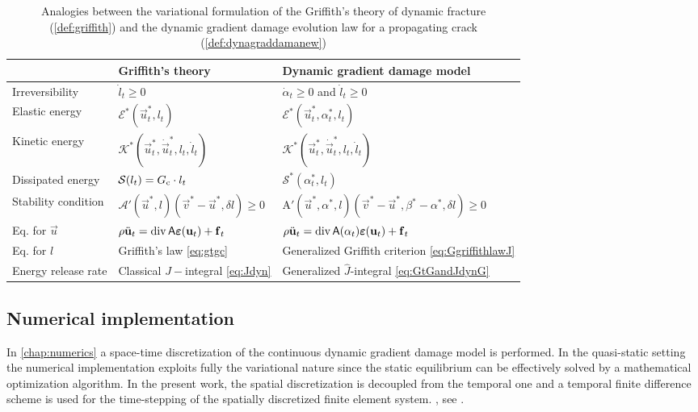 \begin{table}[htbp]
\caption{Analogies between the variational formulation of the Griffith's theory of dynamic fracture (\cref{def:griffith}) and the dynamic gradient damage evolution law for a propagating crack (\cref{def:dynagraddamanew})} \label{tab:analogy}
\centering
\begin{tabular}{lll} \toprule
 & Griffith's theory & Dynamic gradient damage model \\ \midrule
Irreversibility & $\dot{l}_t\geq 0$ & $\dot{\alpha}_t\geq 0$ and $\dot{l}_t\geq 0$ \\
Elastic energy & $\mathcal{E}^*(\vec{u}^*_t,l_t)$ & $\mathcal{E}^*(\vec{u}^*_t,\alpha^*_t,l_t)$ \\
Kinetic energy & $\mathcal{K}^*(\vec{u}_t^*,\dot{\vec{u}}_t^*,l_t,\dot{l}_t)$ & $\mathcal{K}^*(\vec{u}_t^*,\dot{\vec{u}}_t^*,l_t,\dot{l}_t)$ \\
Dissipated energy & $\mathcal{S}(l_t)=G_\mathrm{c}\cdot l_t$ & $\mathcal{S}^*(\alpha^*_t,l_t)$ \\
Stability condition & $\mathcal{A}'(\vec{u}^*,l)(\vec{v}^*-\vec{u}^*,\delta l)\geq 0$ & $\mathrm{A}'(\vec{u}^*,\alpha^*,l)(\vec{v}^*-\vec{u}^*,\beta^*-\alpha^*,\delta l)\geq 0$ \\
Eq. for $\vec{u}$ & $\rho\ddot{\vec{u}}_t=\div\tens{A}\eps(\vec{u}_t)+\vec{f}_t$ & $\rho\ddot{\vec{u}}_t=\div\tens{A}(\alpha_t)\eps(\vec{u}_t)+\vec{f}_t$ \\
Eq. for $l$ & Griffith's law \eqref{eq:gtgc} & Generalized Griffith criterion \eqref{eq:GgriffithlawJ} \\
Energy release rate & Classical $J-$integral \eqref{eq:Jdyn} & Generalized $\widehat{J}$-integral \eqref{eq:GtGandJdynG} \\ \bottomrule
\end{tabular}
\end{table}

\subsection{Numerical implementation}
In \cref{chap:numerics} a space-time discretization of the continuous dynamic gradient damage model is performed. In the quasi-static setting the numerical implementation exploits fully the variational nature since the static equilibrium can be effectively solved by a mathematical optimization algorithm. In the present work, the spatial discretization is decoupled from the temporal one and a temporal finite difference scheme is used for the time-stepping of the spatially discretized finite element system. , see \cite{HughesHulbert:1988}.

